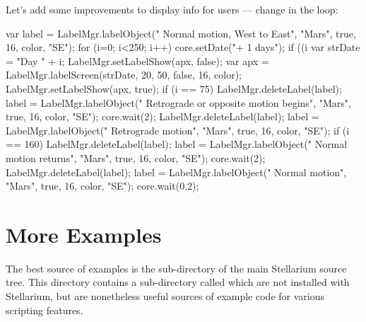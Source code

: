 Let's add some improvements to display info for users --- 
change in the loop:
\begin{script}
var label = LabelMgr.labelObject("  Normal motion, West to 
            East", "Mars", true, 16, color, "SE");
for (i=0; i<250; i++)
{
	core.setDate("+ 1 days");
	if ((i %
	{
		var strDate = "Day " + i;
		LabelMgr.setLabelShow(apx, false);
		var apx = LabelMgr.labelScreen(strDate, 20, 
				  50, false, 16, color);
		LabelMgr.setLabelShow(apx, true);
	}
	if (i == 75)
	{
		LabelMgr.deleteLabel(label);
		label = LabelMgr.labelObject("  Retrograde or 
		        opposite motion begins", "Mars", 
		        true, 16, color, "SE");
		core.wait(2);
		LabelMgr.deleteLabel(label);
		label = LabelMgr.labelObject("  Retrograde 
		        motion", "Mars", true, 16, color, 
		        "SE");
	}
	if (i == 160)
	{
		LabelMgr.deleteLabel(label);
		label = LabelMgr.labelObject("  Normal motion 
		        returns", "Mars", true, 16, color, 
		        "SE");
		core.wait(2);
		LabelMgr.deleteLabel(label);
		label = LabelMgr.labelObject("  Normal motion", 
		        "Mars", true, 16, color, "SE");
	}
	core.wait(0.2);
}
\end{script}

\section{More Examples}
\label{sec:scripting:examples}
The best source of examples is the  sub-directory of the
main Stellarium source tree. This directory contains a sub-directory
called  which are not installed with Stellarium, but are
nonetheless useful sources of example code for various scripting
features.




